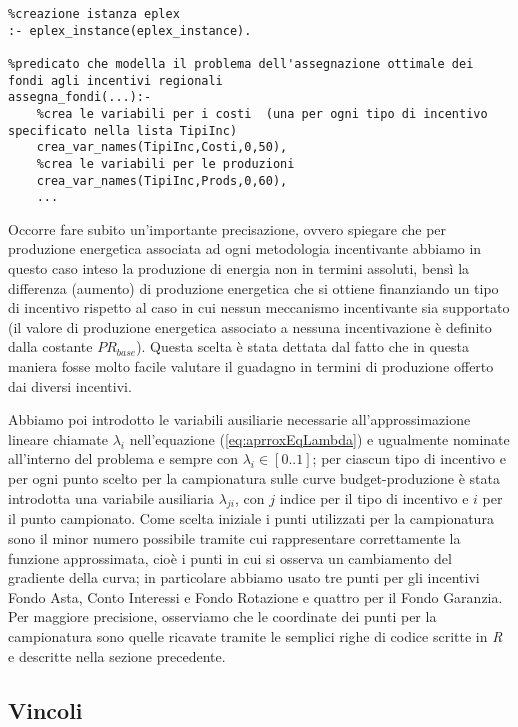 \lstset{language=Prolog}
\begin{lstlisting}
%creazione istanza eplex
:- eplex_instance(eplex_instance).

%predicato che modella il problema dell'assegnazione ottimale dei fondi agli incentivi regionali
assegna_fondi(...):-
	%crea le variabili per i costi  (una per ogni tipo di incentivo specificato nella lista TipiInc)
	crea_var_names(TipiInc,Costi,0,50),
	%crea le variabili per le produzioni
	crea_var_names(TipiInc,Prods,0,60),
	...
\end{lstlisting}

Occorre fare subito un'importante precisazione, ovvero spiegare che per produzione energetica associata ad ogni metodologia incentivante abbiamo in questo caso inteso la produzione di energia non in termini assoluti, bensì la differenza (aumento) di produzione energetica che si ottiene finanziando un tipo di incentivo rispetto al caso in cui nessun meccanismo incentivante sia supportato (il valore di produzione energetica associato a nessuna incentivazione è definito dalla costante $PR_{base}$). Questa scelta è stata dettata dal fatto che in questa maniera fosse molto facile valutare il guadagno in termini di produzione offerto dai diversi incentivi.

Abbiamo poi introdotto le variabili ausiliarie necessarie all'approssimazione lineare chiamate $\lambda_i$ nell'equazione (\ref{eq:aprroxEqLambda}) e ugualmente nominate all'interno del problema e sempre con $\lambda_i \in [0..1]$; per ciascun tipo di incentivo e per ogni punto scelto per la campionatura sulle curve budget-produzione è stata introdotta una variabile ausiliaria $\lambda_{ji}$, con $j$ indice per il tipo di incentivo e $i$ per il punto campionato. Come scelta iniziale i punti utilizzati per la campionatura sono il minor numero possibile tramite cui rappresentare correttamente la funzione approssimata, cioè i punti in cui si osserva un cambiamento del gradiente della curva; in particolare abbiamo usato tre punti per gli incentivi Fondo Asta, Conto Interessi e Fondo Rotazione e quattro per il Fondo Garanzia. Per maggiore precisione, osserviamo che le coordinate dei punti per la campionatura sono quelle ricavate tramite le semplici righe di codice scritte in \emph{R} e descritte nella sezione precedente. 

\subsection{Vincoli}

